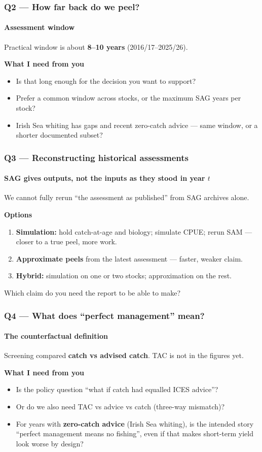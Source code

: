 \documentclass[
  aspectratio=169,
  t,
  onlytextwidth,
  10pt,
]{beamer}
\begin{document}
\begin{frame}
  \frametitle{Q2 --- How far back do we peel?}
  \framesubtitle{Assessment window}

  {\large Practical window is about \textbf{8--10 years} (2016/17--2025/26).}

  \vspace{0.6em}
  \textbf{What I need from you}
  \begin{itemize}
    \item Is that long enough for the decision you want to support?
    \item Prefer a common window across stocks, or the maximum SAG years per stock?
    \item Irish Sea whiting has gaps and recent zero-catch advice --- same window, or a shorter documented subset?
  \end{itemize}
\end{frame}

\begin{frame}
  \frametitle{Q3 --- Reconstructing historical assessments}
  \framesubtitle{SAG gives outputs, not the inputs as they stood in year $t$}

  {\large We cannot fully rerun ``the assessment as published'' from SAG archives alone.}

  \vspace{0.6em}
  \textbf{Options}
  \begin{enumerate}
    \item \textbf{Simulation:} hold catch-at-age and biology; simulate CPUE; rerun SAM --- closer to a true peel, more work.
    \item \textbf{Approximate peels} from the latest assessment --- faster, weaker claim.
    \item \textbf{Hybrid:} simulation on one or two stocks; approximation on the rest.
  \end{enumerate}

  \vspace{0.3em}
  Which claim do you need the report to be able to make?
\end{frame}

\begin{frame}
  \frametitle{Q4 --- What does ``perfect management'' mean?}
  \framesubtitle{The counterfactual definition}

  Screening compared \textbf{catch vs advised catch}. TAC is not in the figures yet.

  \vspace{0.5em}
  \textbf{What I need from you}
  \begin{itemize}
    \item Is the policy question ``what if catch had equalled ICES advice''?
    \item Or do we also need TAC vs advice vs catch (three-way mismatch)?
    \item For years with \textbf{zero-catch advice} (Irish Sea whiting), is the intended story ``perfect management means no fishing'', even if that makes short-term yield look worse by design?
  \end{itemize}
\end{frame}
\end{document}
